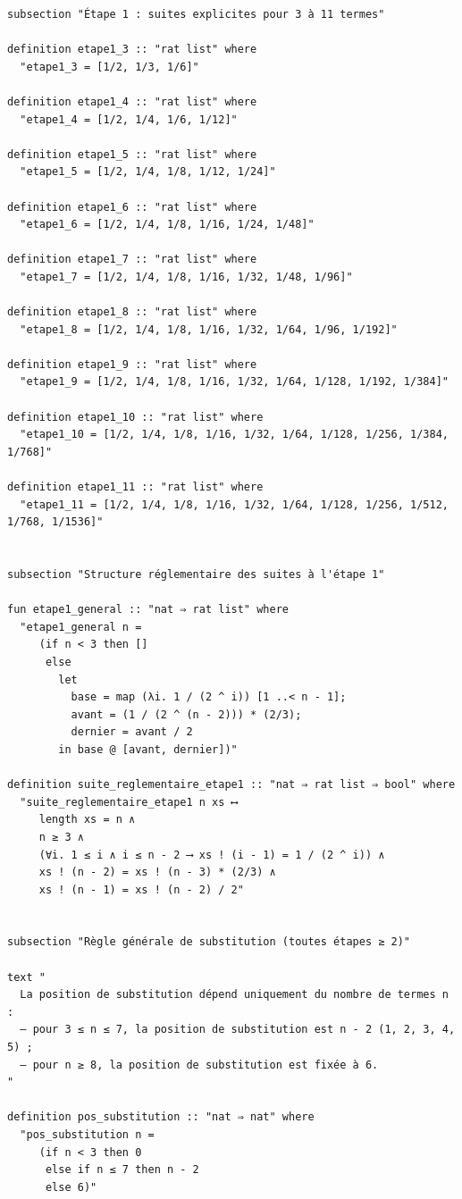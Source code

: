 \documentclass[a4paper,11pt]{article}
\begin{document}
\begin{holcode}[title={\textcolor{white}{Fichier : methode\_de\_philippot.thy -- COMPLET}}]
\begin{lstlisting}
subsection "Étape 1 : suites explicites pour 3 à 11 termes"

definition etape1_3 :: "rat list" where
  "etape1_3 = [1/2, 1/3, 1/6]"

definition etape1_4 :: "rat list" where
  "etape1_4 = [1/2, 1/4, 1/6, 1/12]"

definition etape1_5 :: "rat list" where
  "etape1_5 = [1/2, 1/4, 1/8, 1/12, 1/24]"

definition etape1_6 :: "rat list" where
  "etape1_6 = [1/2, 1/4, 1/8, 1/16, 1/24, 1/48]"

definition etape1_7 :: "rat list" where
  "etape1_7 = [1/2, 1/4, 1/8, 1/16, 1/32, 1/48, 1/96]"

definition etape1_8 :: "rat list" where
  "etape1_8 = [1/2, 1/4, 1/8, 1/16, 1/32, 1/64, 1/96, 1/192]"

definition etape1_9 :: "rat list" where
  "etape1_9 = [1/2, 1/4, 1/8, 1/16, 1/32, 1/64, 1/128, 1/192, 1/384]"

definition etape1_10 :: "rat list" where
  "etape1_10 = [1/2, 1/4, 1/8, 1/16, 1/32, 1/64, 1/128, 1/256, 1/384, 1/768]"

definition etape1_11 :: "rat list" where
  "etape1_11 = [1/2, 1/4, 1/8, 1/16, 1/32, 1/64, 1/128, 1/256, 1/512, 1/768, 1/1536]"


subsection "Structure réglementaire des suites à l'étape 1"

fun etape1_general :: "nat ⇒ rat list" where
  "etape1_general n =
     (if n < 3 then []
      else
        let
          base = map (λi. 1 / (2 ^ i)) [1 ..< n - 1];
          avant = (1 / (2 ^ (n - 2))) * (2/3);
          dernier = avant / 2
        in base @ [avant, dernier])"

definition suite_reglementaire_etape1 :: "nat ⇒ rat list ⇒ bool" where
  "suite_reglementaire_etape1 n xs ⟷
     length xs = n ∧
     n ≥ 3 ∧
     (∀i. 1 ≤ i ∧ i ≤ n - 2 ⟶ xs ! (i - 1) = 1 / (2 ^ i)) ∧
     xs ! (n - 2) = xs ! (n - 3) * (2/3) ∧
     xs ! (n - 1) = xs ! (n - 2) / 2"


subsection "Règle générale de substitution (toutes étapes ≥ 2)"

text "
  La position de substitution dépend uniquement du nombre de termes n :
  – pour 3 ≤ n ≤ 7, la position de substitution est n - 2 (1, 2, 3, 4, 5) ;
  – pour n ≥ 8, la position de substitution est fixée à 6.
"

definition pos_substitution :: "nat ⇒ nat" where
  "pos_substitution n =
     (if n < 3 then 0
      else if n ≤ 7 then n - 2
      else 6)"



\end{lstlisting}
\end{holcode}
\end{document}
